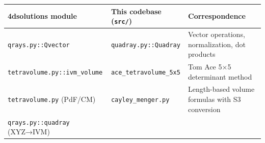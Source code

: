 \documentclass[
  10pt,
]{article}
\begin{document}
\begin{longtable}[]{@{}lll@{}}
\toprule
\begin{minipage}[b]{0.30\columnwidth}\raggedright
4dsolutions module\strut
\end{minipage} & \begin{minipage}[b]{0.35\columnwidth}\raggedright
This codebase (\texttt{src/})\strut
\end{minipage} & \begin{minipage}[b]{0.26\columnwidth}\raggedright
Correspondence\strut
\end{minipage}\tabularnewline
\midrule
\endhead
\begin{minipage}[t]{0.30\columnwidth}\raggedright
\texttt{qrays.py::Qvector}\strut
\end{minipage} & \begin{minipage}[t]{0.35\columnwidth}\raggedright
\texttt{quadray.py::Quadray}\strut
\end{minipage} & \begin{minipage}[t]{0.26\columnwidth}\raggedright
Vector operations, normalization, dot products\strut
\end{minipage}\tabularnewline
\begin{minipage}[t]{0.30\columnwidth}\raggedright
\texttt{tetravolume.py::ivm\_volume}\strut
\end{minipage} & \begin{minipage}[t]{0.35\columnwidth}\raggedright
\texttt{ace\_tetravolume\_5x5}\strut
\end{minipage} & \begin{minipage}[t]{0.26\columnwidth}\raggedright
Tom Ace 5×5 determinant method\strut
\end{minipage}\tabularnewline
\begin{minipage}[t]{0.30\columnwidth}\raggedright
\texttt{tetravolume.py} (PdF/CM)\strut
\end{minipage} & \begin{minipage}[t]{0.35\columnwidth}\raggedright
\texttt{cayley\_menger.py}\strut
\end{minipage} & \begin{minipage}[t]{0.26\columnwidth}\raggedright
Length-based volume formulas with S3 conversion\strut
\end{minipage}\tabularnewline
\begin{minipage}[t]{0.30\columnwidth}\raggedright
\texttt{qrays.py::quadray} (XYZ→IVM)\strut
\end{minipage} & \begin{minipage}[t]{0.35\columnwidth}\raggedright

\end{minipage}
\end{longtable}
\end{document}
